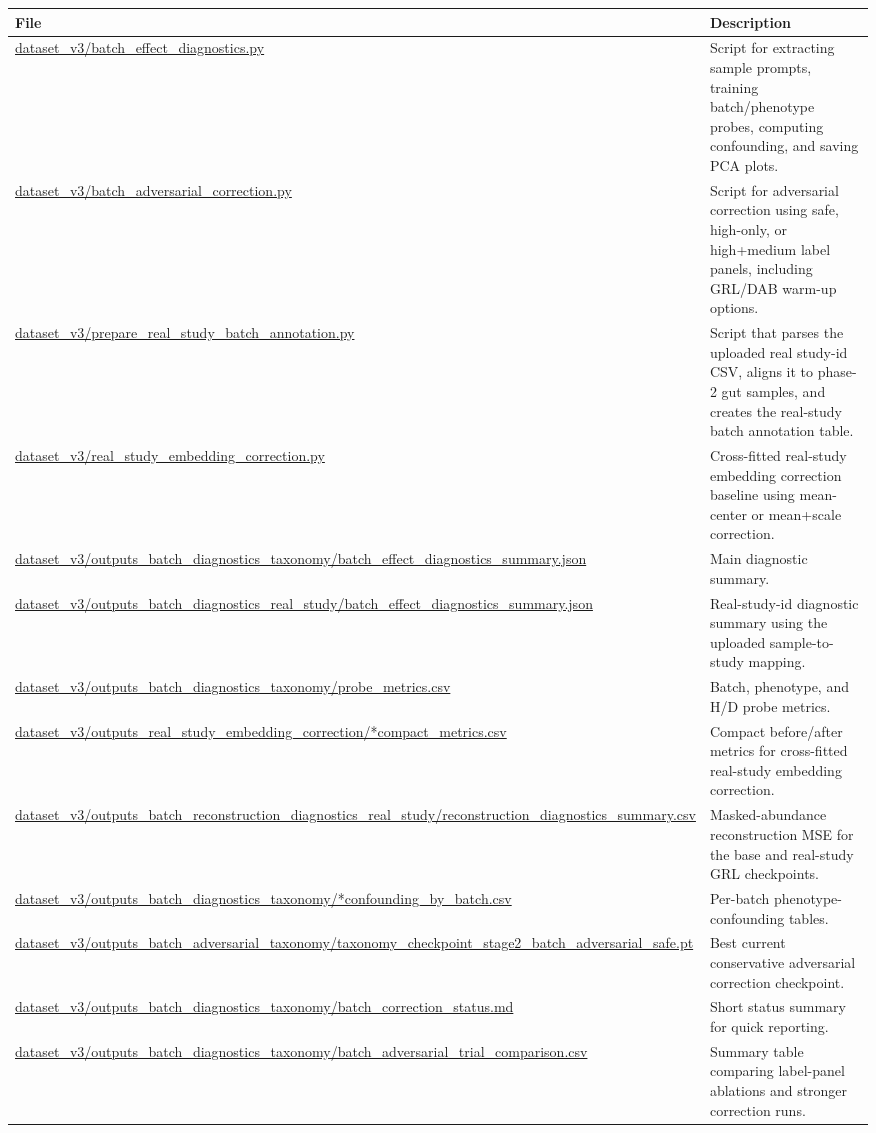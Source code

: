 \documentclass[11pt]{article}
\newcommand{\filepath}[1]{\begingroup\urlstyle{tt}\small\url{#1}\endgroup}
\begin{document}
\begin{longtable}{p{}p{}}
\toprule
File & Description \\
\midrule
\endhead
\filepath{dataset_v3/batch_effect_diagnostics.py} &
Script for extracting sample prompts, training batch/phenotype probes, computing
confounding, and saving PCA plots. \\
\filepath{dataset_v3/batch_adversarial_correction.py} &
Script for adversarial correction using safe, high-only, or high+medium label panels,
including GRL/DAB warm-up options. \\
\filepath{dataset_v3/prepare_real_study_batch_annotation.py} &
Script that parses the uploaded real study-id CSV, aligns it to phase-2 gut samples, and
creates the real-study batch annotation table. \\
\filepath{dataset_v3/real_study_embedding_correction.py} &
Cross-fitted real-study embedding correction baseline using mean-center or mean+scale
correction. \\
\filepath{dataset_v3/outputs_batch_diagnostics_taxonomy/batch_effect_diagnostics_summary.json} &
Main diagnostic summary. \\
\filepath{dataset_v3/outputs_batch_diagnostics_real_study/batch_effect_diagnostics_summary.json} &
Real-study-id diagnostic summary using the uploaded sample-to-study mapping. \\
\filepath{dataset_v3/outputs_batch_diagnostics_taxonomy/probe_metrics.csv} &
Batch, phenotype, and H/D probe metrics. \\
\filepath{dataset_v3/outputs_real_study_embedding_correction/*compact_metrics.csv} &
Compact before/after metrics for cross-fitted real-study embedding correction. \\
\filepath{dataset_v3/outputs_batch_reconstruction_diagnostics_real_study/reconstruction_diagnostics_summary.csv} &
Masked-abundance reconstruction MSE for the base and real-study GRL checkpoints. \\
\filepath{dataset_v3/outputs_batch_diagnostics_taxonomy/*confounding_by_batch.csv} &
Per-batch phenotype-confounding tables. \\
\filepath{dataset_v3/outputs_batch_adversarial_taxonomy/taxonomy_checkpoint_stage2_batch_adversarial_safe.pt} &
Best current conservative adversarial correction checkpoint. \\
\filepath{dataset_v3/outputs_batch_diagnostics_taxonomy/batch_correction_status.md} &
Short status summary for quick reporting. \\
\filepath{dataset_v3/outputs_batch_diagnostics_taxonomy/batch_adversarial_trial_comparison.csv} &
Summary table comparing label-panel ablations and stronger correction runs. \\
\bottomrule
\end{longtable}
\end{document}
